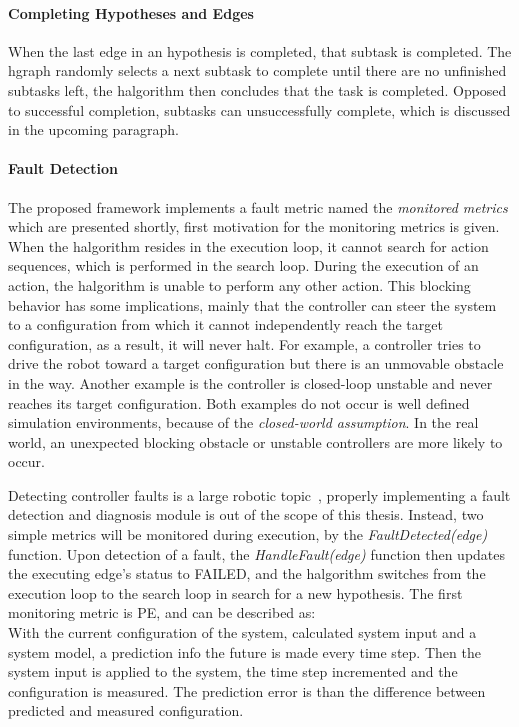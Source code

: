 \paragraph{Completing Hypotheses and Edges}
When the last edge in an hypothesis is completed, that subtask is completed. The \ac{hgraph} randomly selects a next subtask to complete until there are no unfinished subtasks left, the \ac{halgorithm} then concludes that the task is completed. Opposed to successful completion, subtasks can unsuccessfully complete, which is discussed in the upcoming paragraph.\bs

\paragraph{Fault Detection}%
\label{sec:monitoring_metrics}
The proposed framework implements a fault metric named the \textit{monitored metrics} which are presented shortly, first motivation for the monitoring metrics is given. When the \ac{halgorithm} resides in the execution loop, it cannot search for action sequences, which is performed in the search loop. During the execution of an action, the \acl{halgorithm} is unable to perform any other action. This blocking behavior has some implications, mainly that the controller can steer the system to a configuration from which it cannot independently reach the target configuration, as a result, it will never halt. For example, a controller tries to drive the robot toward a target configuration but there is an unmovable obstacle in the way. Another example is the controller is closed-loop unstable and never reaches its target configuration. Both examples do not occur is well defined simulation environments, because of the \textit{closed-world assumption}. In the real world, an unexpected blocking obstacle or unstable controllers are more likely to occur.\bs

Detecting controller faults is a large robotic topic~\cite{khalastchi_fault_2019}, properly implementing a fault detection and diagnosis module is out of the scope of this thesis. Instead, two simple metrics will be monitored during execution, by the \textit{FaultDetected(\gls{edge})} function. Upon detection of a fault, the \textit{HandleFault(\gls{edge})} function then updates the executing edge's status to FAILED, and the \ac{halgorithm} switches from the execution loop to the search loop in search for a new hypothesis. The first monitoring metric is \acl{PE}, and can be described as:\\
With the current configuration of the system, calculated system input and a system model, a prediction info the future is made every time step. Then the system input is applied to the system, the time step incremented and the configuration is measured. The prediction error is than the difference between predicted and measured configuration.\bs

